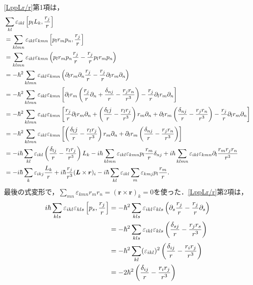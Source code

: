 \eqref{LppLr/r}第1項は，
\begin{align}
  & \sum_{kl}\varepsilon_{ikl}\left[p_lL_k,\frac{r_j}{r}\right] \\
  & = \sum_{klmn}\varepsilon_{ikl}\varepsilon_{kmn}\left[p_lr_mp_n,\frac{r_j}{r}\right]\notag\\
  & = \sum_{klmn}\varepsilon_{ikl}\varepsilon_{kmn}\left(p_lr_mp_n\frac{r_j}{r} - \frac{r_j}{r}p_lr_mp_n\right)\notag\\
  & = - \hbar^2\sum_{klmn}\varepsilon_{ikl}\varepsilon_{kmn}\left(\partial_lr_m\partial_n\frac{r_j}{r} - \frac{r_j}{r}\partial_lr_m\partial_n\right)\notag\\
  & = - \hbar^2\sum_{klmn}\varepsilon_{ikl}\varepsilon_{kmn}\left[\partial_lr_m\left(\frac{r_j}{r}\partial_n + \frac{\delta_{nj}}{r} - \frac{r_jr_n}{r^3}\right) - \frac{r_j}{r}\partial_lr_m\partial_n\right]\notag\\
  & = - \hbar^2\sum_{klmn}\varepsilon_{ikl}\varepsilon_{kmn}\left[\frac{r_j}{r}\partial_lr_m\partial_n + \left(\frac{\delta_lj}{r} - \frac{r_lr_j}{r^3}\right)r_m\partial_n + \partial_lr_m\left(\frac{\delta_{nj}}{r} - \frac{r_jr_n}{r^3}\right) - \frac{r_j}{r}\partial_lr_m\partial_n\right]\notag\\
  & = - \hbar^2\sum_{klmn}\varepsilon_{ikl}\varepsilon_{kmn}\left[\left(\frac{\delta_lj}{r} - \frac{r_lr_j}{r^3}\right)r_m\partial_n + \partial_lr_m\left(\frac{\delta_{nj}}{r} - \frac{r_jr_n}{r^3}\right)\right]\notag\\
  & = - i\hbar\sum_{kl}\varepsilon_{ikl}\left(\frac{\delta_{lj}}{r} - \frac{r_lr_j}{r^3}\right)L_k - i\hbar\sum_{klmn}\varepsilon_{ikl}\varepsilon_{kmn}p_l\frac{r_m}{r}\delta_{nj} + i\hbar\sum_{klmn}\varepsilon_{ikl}\varepsilon_{kmn}\partial_l\frac{r_mr_jr_n}{r^3}\notag\\
  & = - i\hbar\sum_{k}\varepsilon_{ikj}\frac{L_k}{r} + i\hbar\frac{r_j}{r^3}(\boldsymbol{L}\times\boldsymbol{r})_i - i\hbar\sum_{kl}\varepsilon_{ikl}\sum_m\varepsilon_{kmj}p_l\frac{r_m}{r}.\label{LppLr/r_1}
\end{align}
最後の式変形で，$\sum_{mn}\varepsilon_{kmn}r_mr_n=(\boldsymbol{r}\times\boldsymbol{r})_k=0$を使った．\eqref{LppLr/r}第2項は，
\begin{align}
  i\hbar\sum_{kls}\varepsilon_{ikl}\varepsilon_{kls}\left[p_s,\frac{r_j}{r}\right]
  & = - \hbar^2\sum_{kls}\varepsilon_{ikl}\varepsilon_{kls}\left(\partial_s\frac{r_j}{r} - \frac{r_j}{r}\partial_s\right)\notag\\
  & = - \hbar^2\sum_{kls}\varepsilon_{ikl}\varepsilon_{kls}\left(\frac{\delta_{sj}}{r} - \frac{r_jr_s}{r^3}\right)\notag\\
  & = - \hbar^2\sum_{kl}(\varepsilon_{ikl})^2\left(\frac{\delta_{ij}}{r} - \frac{r_ir_j}{r^3}\right)\notag\\
  & = - 2\hbar^2\left(\frac{\delta_{ij}}{r} - \frac{r_ir_j}{r^3}\right)\label{LppLr/r_2}
\end{align}
